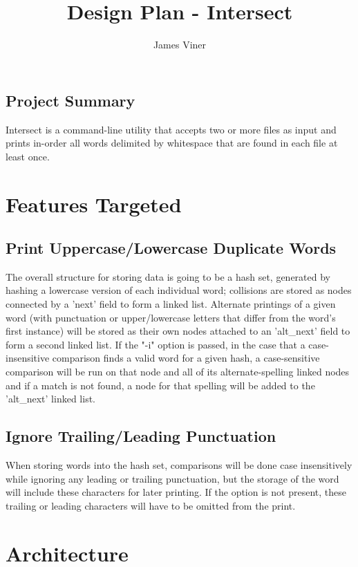 \documentclass[11pt]{report}
\begin{document}
\title{Design Plan - Intersect}
\author{James Viner}
\date{} %
\maketitle

\doublespacing

\vspace*{\fill}
\begin{center}
\section*{\textbf{Project Summary}}
Intersect is a command-line utility that accepts two or more files as input and prints in-order all words delimited by whitespace that are found in each file at least once.
\end{center}
\vfill
\pagebreak
\section*{Features Targeted}
\subsection*{Print Uppercase/Lowercase Duplicate Words}
The overall structure for storing data is going to be a hash set, generated by hashing a lowercase version of each individual word; collisions are stored as nodes connected by a 'next' field to form a linked list. Alternate printings of a given word (with punctuation or upper/lowercase letters that differ from the word's first instance) will be stored as their own nodes attached to an 'alt\_next' field to form a second linked list. If the "-i" option is passed, in the case that a case-insensitive comparison finds a valid word for a given hash, a case-sensitive comparison will be run on that node and all of its alternate-spelling linked nodes and if a match is not found, a node for that spelling will be added to the 'alt\_next' linked list.
\subsection*{Ignore Trailing/Leading Punctuation}
When storing words into the hash set, comparisons will be done case insensitively while ignoring any leading or trailing punctuation, but the storage of the word will include these characters for later printing. If the option is not present, these trailing or leading characters will have to be omitted from the print.
\pagebreak
\section*{Architecture}
\end{document}

